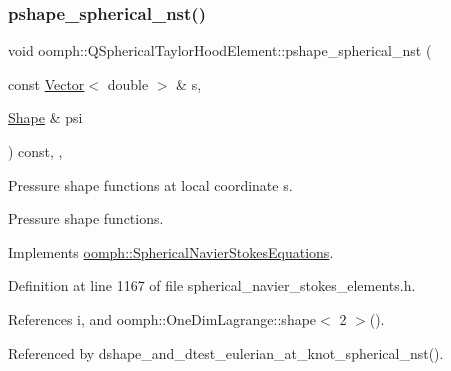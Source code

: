 \subsubsection{\texorpdfstring{pshape\+\_\+spherical\+\_\+nst()}{pshape\_spherical\_nst()}\hspace{0.1cm}{\footnotesize\ttfamily [1/2]}}
{\footnotesize\ttfamily void oomph\+::\+Q\+Spherical\+Taylor\+Hood\+Element\+::pshape\+\_\+spherical\+\_\+nst (\begin{DoxyParamCaption}\item[{const \hyperlink{classoomph_1_1Vector}{Vector}$<$ double $>$ \&}]{s,  }\item[{\hyperlink{classoomph_1_1Shape}{Shape} \&}]{psi }\end{DoxyParamCaption}) const\hspace{0.3cm}{\ttfamily [inline]}, {\ttfamily [protected]}, {\ttfamily [virtual]}}



Pressure shape functions at local coordinate s. 

Pressure shape functions. 

Implements \hyperlink{classoomph_1_1SphericalNavierStokesEquations_a17799ec1f3a1d8bbeee1d357bba0a249}{oomph\+::\+Spherical\+Navier\+Stokes\+Equations}.



Definition at line 1167 of file spherical\+\_\+navier\+\_\+stokes\+\_\+elements.\+h.



References i, and oomph\+::\+One\+Dim\+Lagrange\+::shape$<$ 2 $>$().



Referenced by dshape\+\_\+and\+\_\+dtest\+\_\+eulerian\+\_\+at\+\_\+knot\+\_\+spherical\+\_\+nst().

\mbox{\label{classoomph_1_1QSphericalTaylorHoodElement_afa1ec3d14dbdee7581260678f6790fe7}} 

